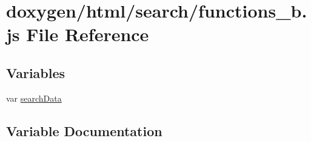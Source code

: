\hypertarget{a00094}{}\section{doxygen/html/search/functions\+\_\+b.js File Reference}
\label{a00094}
\subsection*{Variables}
\begin{DoxyCompactItemize}
\item 
var \hyperlink{a00094_ad01a7523f103d6242ef9b0451861231e}{search\+Data}
\end{DoxyCompactItemize}


\subsection{Variable Documentation}
\hypertarget{a00094_ad01a7523f103d6242ef9b0451861231e}{}
